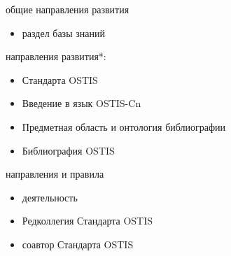 \begin{SCn}
\begin{scnstruct}
{\begin{scnitemize}
			\item общие направления развития
			\begin{itemize}
				\item раздел базы знаний
			\end{itemize}
		\end{scnitemize}
		\begin{scnitemize}
			\item направления развития*:
			\begin{itemize}
				\item Стандарта OSTIS
				\item Введение в язык OSTIS-Cn
				\item Предметная область и онтология библиографии
				\item Библиография OSTIS
			\end{itemize}
		\end{scnitemize}
		\begin{scnitemize}
			\item направления и правила
			\begin{itemize}
				\item деятельность
				\item Редколлегия Стандарта OSTIS
				\item соавтор Стандарта OSTIS
			\end{itemize}
		\end{scnitemize}
	}
\end{scnstruct}
\end{SCn}